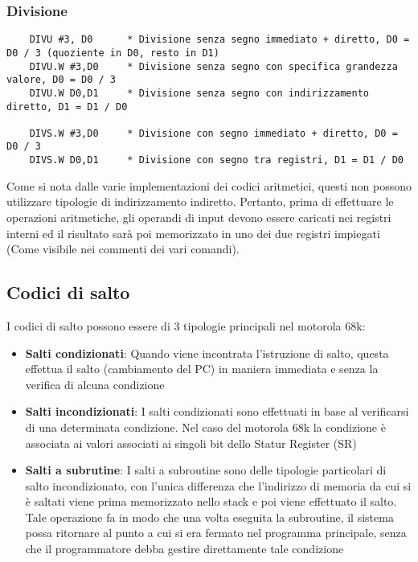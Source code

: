 \subsubsection{Divisione}

\begin{lstlisting}
    DIVU #3, D0      * Divisione senza segno immediato + diretto, D0 = D0 / 3 (quoziente in D0, resto in D1)
    DIVU.W #3,D0     * Divisione senza segno con specifica grandezza valore, D0 = D0 / 3
    DIVU.W D0,D1     * Divisione senza segno con indirizzamento diretto, D1 = D1 / D0

    DIVS.W #3,D0     * Divisione con segno immediato + diretto, D0 = D0 / 3
    DIVS.W D0,D1     * Divisione con segno tra registri, D1 = D1 / D0
\end{lstlisting}

Come si nota dalle varie implementazioni dei codici aritmetici, questi non possono utilizzare tipologie di indirizzamento indiretto. Pertanto, prima di effettuare le operazioni aritmetiche, gli operandi di input devono essere caricati nei registri interni ed il risultato sarà poi memorizzato in uno dei due registri impiegati (Come visibile nei commenti dei vari comandi).

\subsection{Codici di salto} \label{par:salto}

I codici di salto possono essere di 3 tipologie principali nel motorola 68k:
\begin{itemize}
    \item \textbf{Salti condizionati}: Quando viene incontrata l'istruzione di salto, questa effettua il salto (cambiamento del PC) in maniera immediata e senza la verifica di alcuna condizione

    \item \textbf{Salti incondizionati}: I salti condizionati sono effettuati in base al verificarsi di una determinata condizione. Nel caso del motorola 68k la condizione è associata ai valori associati ai singoli bit dello Statur Register (SR)

    \item \textbf{Salti a subrutine}: I salti a subroutine sono delle tipologie particolari di salto incondizionato, con l'unica differenza che l'indirizzo di memoria da cui si è saltati viene prima memorizzato nello stack e poi viene effettuato il salto. Tale operazione fa in modo che una volta eseguita la subroutine, il sistema possa ritornare al punto a cui si era fermato nel programma principale, senza che il programmatore debba gestire direttamente tale condizione
\end{itemize}

